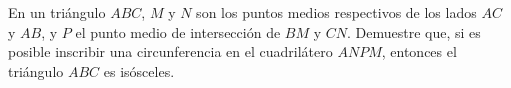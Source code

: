 En un triángulo $ABC$, $M$ y $N$ son los puntos medios respectivos de los lados $AC$ y $AB$, y $P$ el punto medio de intersección de $BM$ y $CN$. Demuestre que, si es posible inscribir una circunferencia en el cuadrilátero $ANPM$, entonces el triángulo $ABC$ es isósceles.